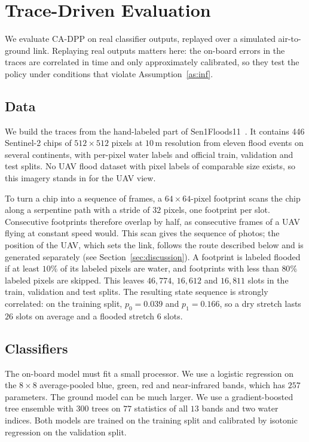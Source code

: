 \section{Trace-Driven Evaluation}\label{sec:results}
We evaluate CA-DPP on real classifier outputs, replayed over a simulated air-to-ground link. Replaying real outputs matters here: the on-board errors in the traces are correlated in time and only approximately calibrated, so they test the policy under conditions that violate Assumption~\ref{as:inf}.

\subsection{Data}
We build the traces from the hand-labeled part of Sen1Floods11~\cite{bonafilia2020sen1floods11}. It contains 446 Sentinel-2 chips of $512\times512$ pixels at $10$\,m resolution from eleven flood events on several continents, with per-pixel water labels and official train, validation and test splits. No UAV flood dataset with pixel labels of comparable size exists, so this imagery stands in for the UAV view.

To turn a chip into a sequence of frames, a $64\times64$-pixel footprint scans the chip along a serpentine path with a stride of $32$ pixels, one footprint per slot. Consecutive footprints therefore overlap by half, as consecutive frames of a UAV flying at constant speed would. This scan gives the sequence of photos; the position of the UAV, which sets the link, follows the route described below and is generated separately (see Section~\ref{sec:discussion}). A footprint is labeled flooded if at least $10\%$ of its labeled pixels are water, and footprints with less than $80\%$ labeled pixels are skipped. This leaves $46{,}774$, $16{,}612$ and $16{,}811$ slots in the train, validation and test splits. The resulting state sequence is strongly correlated: on the training split, $p_0=0.039$ and $p_1=0.166$, so a dry stretch lasts $26$ slots on average and a flooded stretch $6$ slots.

\subsection{Classifiers}
The on-board model must fit a small processor. We use a logistic regression on the $8\times8$ average-pooled blue, green, red and near-infrared bands, which has $257$ parameters. The ground model can be much larger. We use a gradient-boosted tree ensemble with $300$ trees on $77$ statistics of all $13$ bands and two water indices. Both models are trained on the training split and calibrated by isotonic regression on the validation split.

